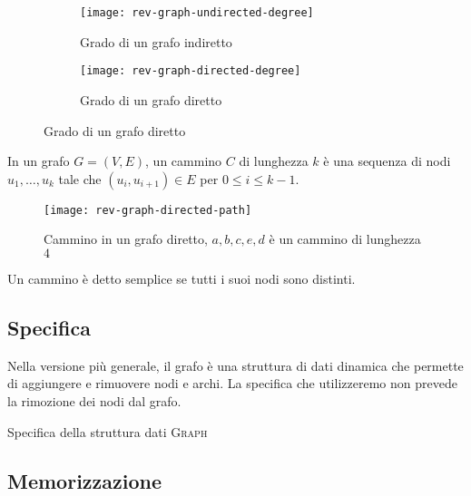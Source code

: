 \begin{figure}[H]
	\begin{subfigure}[t]{.5\textwidth}\centering
		\texttt{[image: rev-graph-undirected-degree]}
		\caption{Grado di un grafo indiretto}
	\end{subfigure}\hfill
	\begin{subfigure}[t]{.5\textwidth}\centering
		\texttt{[image: rev-graph-directed-degree]}
		\caption{Grado di un grafo diretto}
	\end{subfigure}
\end{figure}

\begin{definition}
	In un grafo \(G = (V,E)\), un cammino \(C\) di lunghezza \(k\) è una sequenza di nodi \(u_1, \dots, u_k\) tale che \((u_i, u_{i+1}) \in E\) per \(0 \leqslant i \leqslant k-1 \).
\end{definition}

\begin{figure}[H]\centering
	\texttt{[image: rev-graph-directed-path]}
	\caption[Cammino in un grafo diretto]{Cammino in un grafo diretto, \(a, b, c, e, d\) è un cammino di lunghezza \(4\)}
\end{figure}

\begin{note}
Un cammino è detto semplice se tutti i suoi nodi sono distinti.
\end{note}

\clearpage
\subsection{Specifica}

Nella versione più generale, il grafo è una struttura di dati dinamica che permette di aggiungere e  rimuovere nodi e archi.
La specifica che utilizzeremo non prevede la rimozione dei nodi dal grafo.

\begin{algorithm}[H]
	\caption{Specifica della struttura dati \textsc{Graph}}
	
\end{algorithm}

\subsection{Memorizzazione}

